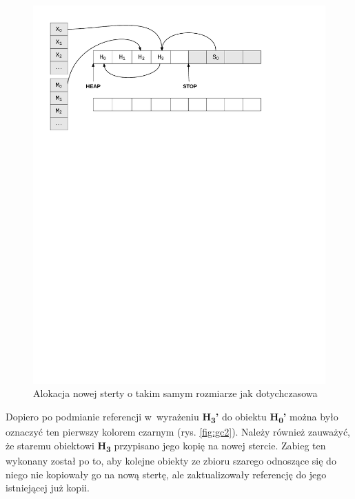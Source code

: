 \begin{figure}[h]
\centerline{\includegraphics[scale=0.75, clip, trim=10mm 185mm 45mm 10mm]{gc_1}}
\caption{Alokacja nowej sterty o takim samym rozmiarze jak dotychczasowa}
\label{fig:gc1}
\end{figure}

Dopiero po podmianie referencji w~wyrażeniu \textbf{H\textsubscript{3}'} do obiektu \textbf{H\textsubscript{0}'} można było oznaczyć ten pierwszy kolorem czarnym (rys. \ref{fig:gc2}).
Należy również zauważyć, że staremu obiektowi \textbf{H\textsubscript{3}} przypisano jego kopię na nowej stercie.
Zabieg ten wykonany został po to, aby kolejne obiekty ze zbioru szarego odnoszące się do niego nie kopiowały go na nową stertę, ale zaktualizowały referencję do jego istniejącej już kopii.


